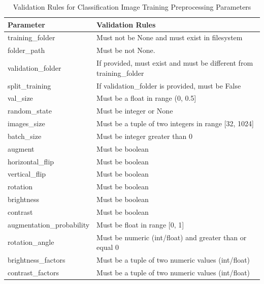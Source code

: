 \begin{table}[H]
\centering
\begin{tabular}{|l|l|}
\hline
\textbf{Parameter} & \textbf{Validation Rules} \\
\hline

training\_folder &
Must not be None and must exist in filesystem \\
folder\_path& Must be not None.\\
validation\_folder &
If provided, must exist and must be different from training\_folder \\

split\_training &
If validation\_folder is provided, must be False \\

val\_size &
Must be a float in range (0, 0.5] \\

random\_state &
Must be integer or None \\

images\_size &
Must be a tuple of two integers in range [32, 1024] \\

batch\_size &
Must be integer greater than 0 \\

augment &
Must be boolean \\

horizontal\_flip &
Must be boolean \\

vertical\_flip &
Must be boolean \\

rotation &
Must be boolean \\

brightness &
Must be boolean \\

contrast &
Must be boolean \\

augmentation\_probability &
Must be float in range [0, 1] \\

rotation\_angle &
Must be numeric (int/float) and greater than or equal 0 \\

brightness\_factors &
Must be a tuple of two numeric values (int/float) \\

contrast\_factors &
Must be a tuple of two numeric values (int/float) \\

\hline
\end{tabular}
\caption{Validation Rules for Classification Image Training Preprocessing Parameters}
\end{table}

